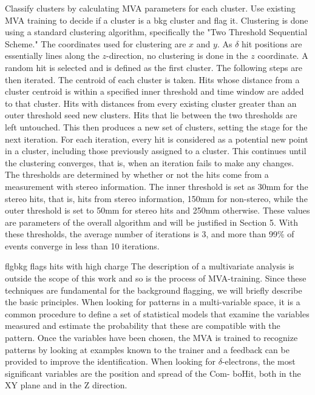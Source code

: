 Classify clusters by calculating MVA parameters for each cluster.
Use existing MVA training to decide if a cluster is a bkg cluster and flag it.
Clustering is done using a standard clustering algorithm, specifically the "Two Threshold
Sequential Scheme." The coordinates used for clustering are $x$ and $y$. As $\delta$ hit positions are
essentially lines along the $z$-direction, no clustering is done in the $z$ coordinate. A random hit is
selected and is defined as the first cluster. The following steps are then iterated. The centroid of each
cluster is taken. Hits whose distance from a cluster centroid is within a specified inner threshold and
time window are added to that cluster. Hits with distances from every existing cluster greater than an
outer threshold seed new clusters. Hits that lie between the two thresholds are left untouched. This
then produces a new set of clusters, setting the stage for the next iteration. For each iteration, every
hit is considered as a potential new point in a cluster, including those previously assigned to a cluster.
This continues until the clustering converges, that is, when an iteration fails to make any changes.
The thresholds are determined by whether or not the hits come from a measurement with stereo
information. The inner threshold is set as 30mm for the stereo hits, that is, hits from stereo
information, 150mm for non-stereo, while the outer threshold is set to 50mm for stereo hits and
250mm otherwise. These values are parameters of the overall algorithm and will be justified in
Section 5. With these thresholds, the average number of iterations is 3, and more than 99\% of events
converge in less than 10 iterations.

flgbkg flags hits with high charge
The description of a multivariate analysis is outside the scope of this work and so is the process
of MVA-training. Since these techniques are fundamental for the background flagging, we will briefly
describe the basic principles. When looking for patterns in a multi-variable space, it is a common
procedure to define a set of statistical models that examine the variables measured and estimate the
probability that these are compatible with the pattern. Once the variables have been chosen, the
MVA is trained to recognize patterns by looking at examples known to the trainer and a feedback can
be provided to improve the identification.
When looking for $\delta$-electrons, the most significant variables are the position and spread of the Com-
boHit, both in the XY plane and in the Z direction.

